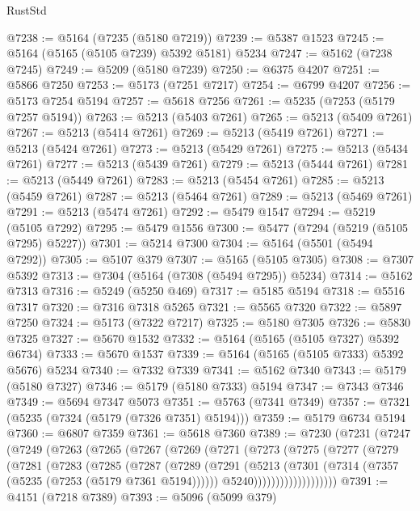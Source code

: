 \begin{lexlean}{RustStd}
\begin{coremodule}
@7238 := @5164 (@7235 (@5180 @7219))
@7239 := @5387 @1523
@7245 := @5164 (@5165 (@5105 @7239) @5392 @5181) @5234
@7247 := @5162 (@7238 @7245)
@7249 := @5209 (@5180 @7239)
@7250 := @6375 @4207
@7251 := @5866 @7250
@7253 := @5173 (@7251 @7217)
@7254 := @6799 @4207
@7256 := @5173 @7254 @5194
@7257 := @5618 @7256
@7261 := @5235 (@7253 (@5179 @7257 @5194))
@7263 := @5213 (@5403 @7261)
@7265 := @5213 (@5409 @7261)
@7267 := @5213 (@5414 @7261)
@7269 := @5213 (@5419 @7261)
@7271 := @5213 (@5424 @7261)
@7273 := @5213 (@5429 @7261)
@7275 := @5213 (@5434 @7261)
@7277 := @5213 (@5439 @7261)
@7279 := @5213 (@5444 @7261)
@7281 := @5213 (@5449 @7261)
@7283 := @5213 (@5454 @7261)
@7285 := @5213 (@5459 @7261)
@7287 := @5213 (@5464 @7261)
@7289 := @5213 (@5469 @7261)
@7291 := @5213 (@5474 @7261)
@7292 := @5479 @1547
@7294 := @5219 (@5105 @7292)
@7295 := @5479 @1556
@7300 := @5477 (@7294 (@5219 (@5105 @7295) @5227))
@7301 := @5214 @7300
@7304 := @5164 (@5501 (@5494 @7292))
@7305 := @5107 @379
@7307 := @5165 (@5105 @7305)
@7308 := @7307 @5392
@7313 := @7304 (@5164 (@7308 (@5494 @7295)) @5234)
@7314 := @5162 @7313
@7316 := @5249 (@5250 @469)
@7317 := @5185 @5194
@7318 := @5516 @7317
@7320 := @7316 @7318 @5265
@7321 := @5565 @7320
@7322 := @5897 @7250
@7324 := @5173 (@7322 @7217)
@7325 := @5180 @7305
@7326 := @5830 @7325
@7327 := @5670 @1532
@7332 := @5164 (@5165 (@5105 @7327) @5392 @6734)
@7333 := @5670 @1537
@7339 := @5164 (@5165 (@5105 @7333) @5392 @5676) @5234
@7340 := @7332 @7339
@7341 := @5162 @7340
@7343 := @5179 (@5180 @7327)
@7346 := @5179 (@5180 @7333) @5194
@7347 := @7343 @7346
@7349 := @5694 @7347 @5073
@7351 := @5763 (@7341 @7349)
@7357 := @7321 (@5235 (@7324 (@5179 (@7326 @7351) @5194)))
@7359 := @5179 @6734 @5194
@7360 := @6807 @7359
@7361 := @5618 @7360
@7389 := @7230
    (@7231
      (@7247
        (@7249
          (@7263
            (@7265
              (@7267
                (@7269
                  (@7271
                    (@7273
                      (@7275
                        (@7277
                          (@7279
                            (@7281
                              (@7283
                                (@7285
                                  (@7287
                                    (@7289
                                      (@7291
                                        (@5213
                                          (@7301
                                            (@7314 (@7357 (@5235 (@7253 (@5179 @7361 @5194))))))
                                          @5240)))))))))))))))))))
@7391 := @4151 (@7218 @7389)
@7393 := @5096 (@5099 @379)

\end{coremodule}
\end{lexlean}
